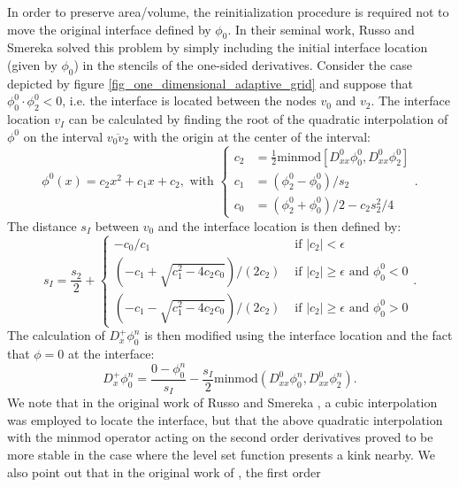 \documentclass[english]{article}
\begin{document}
In order to preserve area/volume, the reinitialization procedure is
required not to move the original interface defined by $\phi_0$. In their
seminal work, Russo and Smereka \cite{Russo_Smereka} solved this problem by
simply including the initial interface location (given by $\phi_0$) in the
stencils of the one-sided derivatives. Consider the case depicted by figure
\ref{fig_one_dimensional_adaptive_grid} and suppose that
$\phi^0_0\cdot\phi^0_2<0$, i.e. the interface is located between the nodes
$v_0$ and $v_2$. The interface location $v_I$ can be calculated by finding
the root of the quadratic interpolation of $\phi^0$ on the interval
$\overline{v_0v_2}$ with the origin at the center of the interval:
\begin{equation*}
\phi^0(x)=c_2x^2+c_1x+c_2,
\text{  with }
\begin{cases}
c_2 &= \frac12\text{minmod}\left[D^0_{xx}\phi^0_0,D^0_{xx}\phi^0_2\right] \\
c_1 &= (\phi^0_2-\phi^0_0)/s_2 \\
c_0 &= (\phi^0_2+\phi^0_0)/  2 - c_2s_2^2/4
\end{cases}.
\end{equation*}
The distance $s_I$ between $v_0$ and the interface location is then defined by:
\begin{equation*}
s_I = \frac{s_2}2 +
\begin{cases}
-c_0/c_1                            & \text{ if $|c_2|<  \epsilon$ }\\
(-c_1+\sqrt{c_1^2-4c_2c_0})/(2c_2)  & \text{ if $|c_2|\ge\epsilon$ and $\phi^0_0<0$}\\
(-c_1-\sqrt{c_1^2-4c_2c_0})/(2c_2)  & \text{ if $|c_2|\ge\epsilon$ and $\phi^0_0>0$}
\end{cases}.
\end{equation*}
The calculation of $D_x^+\phi^n_0$ is then modified using the interface
location and the fact that $\phi=0$ at the interface:
\begin{equation*}
D^+_x\phi^n_0 = \frac{0-\phi_0^n}{s_I} -
\frac{s_I}{2}\text{minmod}\left(D^0_{xx}\phi^n_0,D^0_{xx}\phi^n_2\right).
\end{equation*}
We note that in the original work of Russo and Smereka
\cite{Russo_Smereka}, a cubic interpolation was employed to locate the
interface, but that the above quadratic interpolation with the minmod
operator acting on the second order derivatives proved to be more stable in
the case where the level set function presents a kink nearby. We also point
out that in the original work of \cite{Russo_Smereka}, the first order
\end{document}
